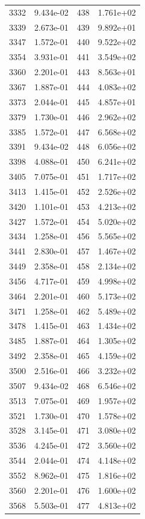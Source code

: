 \documentclass[12pt]{article}
\begin{document}
\begin{longtable}{@{}cccc@{}}
3332 & 9.434e-02 & 438 & 1.761e+02 \\
3339 & 2.673e-01 & 439 & 9.892e+01 \\
3347 & 1.572e-01 & 440 & 9.522e+02 \\
3354 & 3.931e-01 & 441 & 3.549e+02 \\
3360 & 2.201e-01 & 443 & 8.563e+01 \\
3367 & 1.887e-01 & 444 & 4.083e+02 \\
3373 & 2.044e-01 & 445 & 4.857e+01 \\
3379 & 1.730e-01 & 446 & 2.962e+02 \\
3385 & 1.572e-01 & 447 & 6.568e+02 \\
3391 & 9.434e-02 & 448 & 6.056e+02 \\
3398 & 4.088e-01 & 450 & 6.241e+02 \\
3405 & 7.075e-01 & 451 & 1.717e+02 \\
3413 & 1.415e-01 & 452 & 2.526e+02 \\
3420 & 1.101e-01 & 453 & 4.213e+02 \\
3427 & 1.572e-01 & 454 & 5.020e+02 \\
3434 & 1.258e-01 & 456 & 5.565e+02 \\
3441 & 2.830e-01 & 457 & 1.467e+02 \\
3449 & 2.358e-01 & 458 & 2.134e+02 \\
3456 & 4.717e-01 & 459 & 4.998e+02 \\
3464 & 2.201e-01 & 460 & 5.173e+02 \\
3471 & 1.258e-01 & 462 & 5.489e+02 \\
3478 & 1.415e-01 & 463 & 1.434e+02 \\
3485 & 1.887e-01 & 464 & 1.305e+02 \\
3492 & 2.358e-01 & 465 & 4.159e+02 \\
3500 & 2.516e-01 & 466 & 3.232e+02 \\
3507 & 9.434e-02 & 468 & 6.546e+02 \\
3513 & 7.075e-01 & 469 & 1.957e+02 \\
3521 & 1.730e-01 & 470 & 1.578e+02 \\
3528 & 3.145e-01 & 471 & 3.080e+02 \\
3536 & 4.245e-01 & 472 & 3.560e+02 \\
3544 & 2.044e-01 & 474 & 4.148e+02 \\
3552 & 8.962e-01 & 475 & 1.816e+02 \\
3560 & 2.201e-01 & 476 & 1.600e+02 \\
3568 & 5.503e-01 & 477 & 4.813e+02 \\

\end{longtable}
\end{document}
